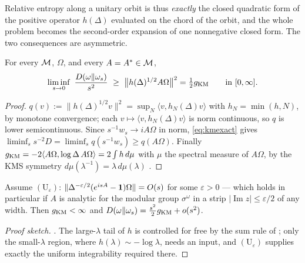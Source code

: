 Relative entropy along a unitary orbit is thus \emph{exactly} the closed quadratic form of the positive
operator $h(\Delta)$ evaluated on the chord of the orbit, and the whole problem becomes the second-order
expansion of one nonnegative closed form.  The two consequences are asymmetric.

\begin{theorem}\label{thm:kmlower}
For every $\mathcal M$, $\Omega$, and every $A=A^{*}\in\mathcal M$,
\begin{equation}\label{eq:kmlower}
 \liminf_{s\to0}\ \frac{D(\omega\Vert\omega_{s})}{s^{2}}\ \ge\
 \bigl\|h(\Delta)^{1/2}A\Omega\bigr\|^{2}=\tfrac12g_{\mathrm{KM}}\qquad\text{in }[0,\infty].
\end{equation}
\end{theorem}

\begin{proof}
$q(v):=\|h(\Delta)^{1/2}v\|^{2}=\sup_{N}\langle v,h_{N}(\Delta)v\rangle$ with $h_{N}=\min(h,N)$, by monotone
convergence; each $v\mapsto\langle v,h_{N}(\Delta)v\rangle$ is norm continuous, so $q$ is lower
semicontinuous.  Since $s^{-1}w_{s}\to iA\Omega$ in norm, \eqref{eq:kmexact} gives
$\liminf_{s}s^{-2}D=\liminf_{s}q(s^{-1}w_{s})\ge q(A\Omega)$.  Finally
$g_{\mathrm{KM}}=-2\langle A\Omega,\log\Delta\,A\Omega\rangle=2\int h\,d\mu$ with $\mu$ the spectral measure of
$A\Omega$, by the KMS symmetry $d\mu(\lambda^{-1})=\lambda\,d\mu(\lambda)$ \cite[Lemma 3.5]{RigorKM}.
\end{proof}

\begin{theorem}\label{thm:kmupper}
Assume $(\mathrm U_{\varepsilon})$: $\|\Delta^{-\varepsilon/2}(e^{isA}-\mathbf 1)\Omega\|=O(s)$ for some
$\varepsilon>0$ --- which holds in particular if $A$ is analytic for the modular group $\sigma^{\omega}$ in
a strip $|\operatorname{Im}z|\le\varepsilon/2$ of any width.  Then $g_{\mathrm{KM}}<\infty$ and
$D(\omega\Vert\omega_{s})=\frac{s^{2}}{2}g_{\mathrm{KM}}+o(s^{2})$.
\end{theorem}

\begin{proof}[Proof sketch]
\cite[\S5, Thm.~5.9 with Thm.~5.8]{RigorKM}.  The large-$\lambda$ tail of $h$ is controlled for free by the sum rule of
\Cref{thm:kmexact}; only the small-$\lambda$ region, where $h(\lambda)\sim-\log\lambda$, needs an input, and
$(\mathrm U_{\varepsilon})$ supplies exactly the uniform integrability required there.
\end{proof}

